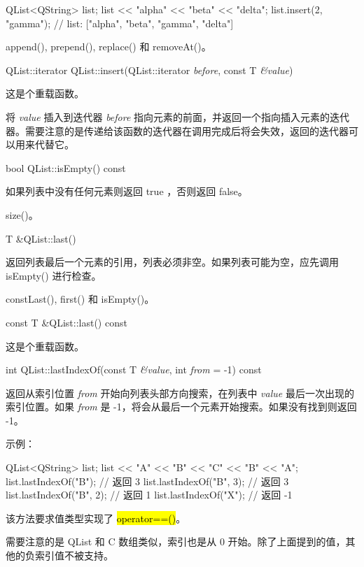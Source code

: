 \begin{cppcode}
QList<QString> list;
list << "alpha" << "beta" << "delta";
list.insert(2, "gamma");
// list: ["alpha", "beta", "gamma", "delta"]
\end{cppcode}



\begin{seeAlso}
append(), prepend(), replace() 和 removeAt()。
\end{seeAlso}

QList::iterator QList::insert(QList::iterator \emph{before}, const T \emph{\&value})

这是个重载函数。

将 \emph{value} 插入到迭代器 \emph{before} 指向元素的前面，并返回一个指向插入元素的迭代器。需要注意的是传递给该函数的迭代器在调用完成后将会失效，返回的迭代器可以用来代替它。

bool QList::isEmpty() const

如果列表中没有任何元素则返回 true ，否则返回 false。

\begin{seeAlso}
size()。
\end{seeAlso}


T \&QList::last()

返回列表最后一个元素的引用，列表必须非空。如果列表可能为空，应先调用 isEmpty() 进行检查。


\begin{seeAlso}
constLast(), first() 和 isEmpty()。
\end{seeAlso}


const T \&QList::last() const

这是个重载函数。

int QList::lastIndexOf(const T \emph{\&value}, int \emph{from} = -1) const

返回从索引位置 \emph{from} 开始向列表头部方向搜索，在列表中 \emph{value} 最后一次出现的索引位置。如果 \emph{from} 是 -1，将会从最后一个元素开始搜索。如果没有找到则返回 -1。

示例：

\begin{cppcode}
QList<QString> list;
list << "A" << "B" << "C" << "B" << "A";
list.lastIndexOf("B");      // 返回 3
list.lastIndexOf("B", 3);   // 返回 3
list.lastIndexOf("B", 2);   // 返回 1
list.lastIndexOf("X");      // 返回 -1
\end{cppcode}

该方法要求值类型实现了 \hl{operator==()}。

需要注意的是 QList 和 C 数组类似，索引也是从 0 开始。除了上面提到的值，其他的负索引值不被支持。


